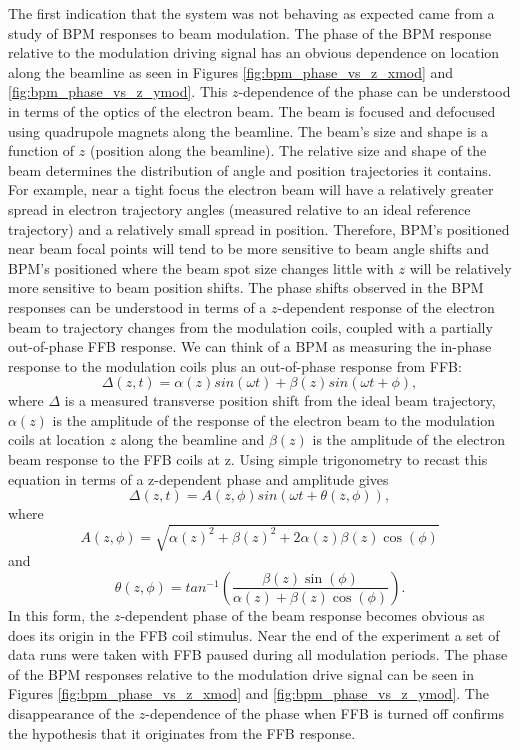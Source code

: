 The first indication that the system was not behaving as expected came from a study of BPM responses to beam modulation. The phase of the BPM response relative to the modulation driving signal has an obvious dependence on location along the beamline as seen in Figures \ref{fig:bpm_phase_vs_z_xmod} and \ref{fig:bpm_phase_vs_z_ymod}. This $z$-dependence of the phase can be understood in terms of the optics  of the electron beam. The beam is focused and defocused using quadrupole magnets along the beamline. The beam's size and shape is a function of $z$ (position along the beamline). The relative size and shape of the beam determines the distribution of angle and position trajectories it contains. For example, near a tight focus the electron beam will have a relatively greater spread in electron trajectory angles (measured relative to an ideal reference trajectory) and a relatively small spread in position. Therefore, BPM's positioned near beam focal points will tend to be more sensitive to beam angle shifts and BPM's positioned where the beam spot size changes little with $z$ will be relatively more sensitive to beam position shifts. The phase shifts observed in the BPM responses can be understood in terms of a $z$-dependent response of the electron beam to trajectory changes from the modulation coils, coupled  with a partially out-of-phase FFB response. We can think of a BPM as measuring the in-phase response to the modulation coils plus an out-of-phase response from FFB:
\begin{equation}
\Delta(z,t) = \alpha(z) sin(\omega t) + \beta(z) sin(\omega t + \phi), 
\label{eq:z_dep_response}
\end{equation}
where $\Delta$ is a measured transverse position shift from the ideal beam trajectory, $\alpha(z)$ is the amplitude of the response of the electron beam to the modulation coils at location $z$ along the beamline and $\beta(z)$ is the amplitude of the electron beam response to the FFB coils at z. Using simple trigonometry to recast this equation in terms of a z-dependent phase and amplitude gives
\begin{equation}
\Delta(z,t) = A(z,\phi) sin(\omega t + \theta(z,\phi)), 
\label{eq:z_dependent_phi}
\end{equation} 
where 
\[
A(z,\phi)=\sqrt{\alpha(z)^2+\beta(z)^2+2\alpha(z)\beta(z)\cos(\phi)}
\]
and 
\[
\theta(z,\phi) = tan^{-1}\left( \frac{\beta(z)\sin(\phi)}{\alpha(z)+\beta(z)\cos(\phi)}\right).
\]
In this form, the $z$-dependent phase of the beam response becomes obvious as does its origin in the FFB coil stimulus. Near the end of the \Qs experiment a set of data runs were taken with FFB paused during all modulation periods. The phase of the BPM responses relative to the modulation drive signal can be seen in Figures \ref{fig:bpm_phase_vs_z_xmod} and  \ref{fig:bpm_phase_vs_z_ymod}. The disappearance of the $z$-dependence of the phase when FFB is turned off confirms the hypothesis that it originates from the FFB response.

